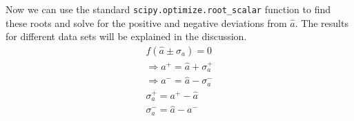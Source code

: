 Now we can use the standard \texttt{scipy.optimize.root\_scalar} function to find these roots and solve for the positive and negative deviations from \( \hat{a} \). The results for different data sets will be explained in the discussion.
\begin{gather}
    f(\hat{a} \pm \sigma_a) = 0 \\
    \Rightarrow a^+ = \hat{a} + \sigma_a^+ \\
    \Rightarrow a^- = \hat{a} - \sigma_a^- \\
    \sigma_a^+ = a^+ - \hat{a} \\
    \sigma_a^- = \hat{a} - a^-
\end{gather}